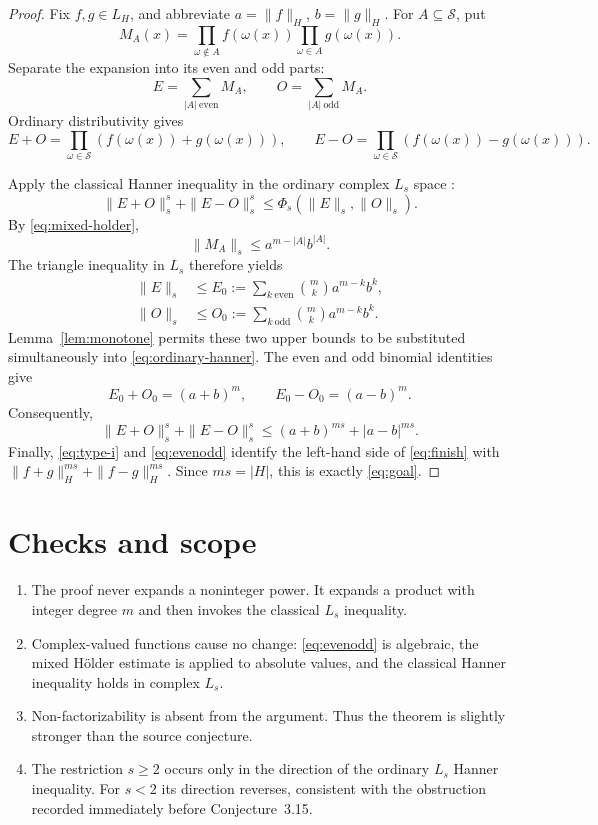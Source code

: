 \documentclass[11pt]{article}
\newcommand{\cS}{\mathcal S}
\begin{document}
\begin{proof}
Fix $f,g\in L_H$, and abbreviate $a=\|f\|_H$, $b=\|g\|_H$.
For $A\subseteq\cS$, put
\[
 M_A(x)=\prod_{\omega\notin A}f(\omega(x))
        \prod_{\omega\in A}g(\omega(x)).
\]
Separate the expansion into its even and odd parts:
\[
 E=\sum_{|A|\ \mathrm{even}}M_A,
 \qquad
 O=\sum_{|A|\ \mathrm{odd}}M_A.
\]
Ordinary distributivity gives
\begin{equation}\label{eq:evenodd}
 E+O=\prod_{\omega\in\cS}(f(\omega(x))+g(\omega(x))),
 \qquad
 E-O=\prod_{\omega\in\cS}(f(\omega(x))-g(\omega(x))).
\end{equation}

Apply the classical Hanner inequality in the ordinary complex $L_s$ space
\cite{Hanner}:
\begin{equation}\label{eq:ordinary-hanner}
 \|E+O\|_s^s+\|E-O\|_s^s
 \le \Phi_s(\|E\|_s,\|O\|_s).
\end{equation}
By \eqref{eq:mixed-holder},
\[
 \|M_A\|_s\le a^{m-|A|}b^{|A|}.
\]
The triangle inequality in $L_s$ therefore yields
\begin{align*}
 \|E\|_s&\le E_0:=\sum_{k\ \mathrm{even}}\binom{m}{k}a^{m-k}b^k,\\
 \|O\|_s&\le O_0:=\sum_{k\ \mathrm{odd}}\binom{m}{k}a^{m-k}b^k.
\end{align*}
Lemma~\ref{lem:monotone} permits these two upper bounds to be substituted
simultaneously into \eqref{eq:ordinary-hanner}.  The even and odd binomial
identities give
\[
 E_0+O_0=(a+b)^m,
 \qquad E_0-O_0=(a-b)^m.
\]
Consequently,
\begin{equation}\label{eq:finish}
 \|E+O\|_s^s+\|E-O\|_s^s
 \le (a+b)^{ms}+|a-b|^{ms}.
\end{equation}
Finally, \eqref{eq:type-i} and \eqref{eq:evenodd} identify the left-hand
side of \eqref{eq:finish} with
$\|f+g\|_H^{ms}+\|f-g\|_H^{ms}$.  Since $ms=|H|$, this is exactly
\eqref{eq:goal}.
\end{proof}

\section{Checks and scope}

\begin{enumerate}[leftmargin=2em]
\item The proof never expands a noninteger power.  It expands a product with
integer degree $m$ and then invokes the classical $L_s$ inequality.
\item Complex-valued functions cause no change: \eqref{eq:evenodd} is
algebraic, the mixed H\"older estimate is applied to absolute values, and the
classical Hanner inequality holds in complex $L_s$.
\item Non-factorizability is absent from the argument.  Thus the theorem is
slightly stronger than the source conjecture.
\item The restriction $s\ge2$ occurs only in the direction of the ordinary
$L_s$ Hanner inequality.  For $s<2$ its direction reverses, consistent with
the obstruction recorded immediately before Conjecture~3.15.
\end{enumerate}
\end{document}
